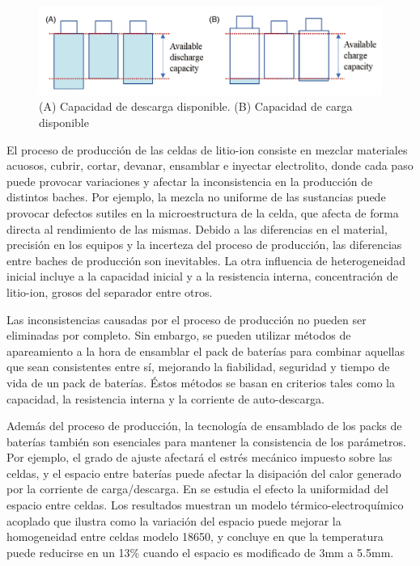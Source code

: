 \documentclass[10pt,a4paper]{article}
\newcounter{subsubsubsection}[subsubsection]
\begin{document}
\begin{figure}[h!]
    \begin{center}
        \includegraphics[width=1\textwidth]{barrel_effect.png}
        \caption{(A) Capacidad de descarga disponible. (B) Capacidad de carga
        disponible}
        \label{barrel_effect}
    \end{center}
\end{figure}


El proceso de producci\'on de las celdas de litio-ion consiste en mezclar
materiales acuosos, cubrir, cortar, devanar, ensamblar e inyectar electrolito,
donde cada paso puede provocar variaciones y afectar la inconsistencia en
la producci\'on de distintos baches. Por ejemplo, la mezcla no uniforme de las
sustancias puede provocar defectos sutiles en la microestructura de la celda,
que afecta de forma directa al rendimiento de las mismas. Debido a las
diferencias en el material, precisi\'on en los equipos y la
incerteza del proceso de producci\'on, las diferencias entre
baches de producci\'on son inevitables. La otra influencia de heterogeneidad
inicial incluye a la capacidad inicial y a la resistencia interna,
concentraci\'on de litio-ion, grosos del separador entre otros.

Las inconsistencias causadas por el proceso de producci\'on no pueden ser
eliminadas por completo. Sin embargo, se pueden utilizar m\'etodos de
apareamiento a la hora de ensamblar el pack de bater\'ias para combinar aquellas
que sean consistentes entre s\'i, mejorando la fiabilidad, seguridad y tiempo
de vida de un pack de bater\'ias. \'Estos m\'etodos se basan en criterios tales
como la capacidad, la resistencia interna y la corriente de auto-descarga.


Adem\'as del proceso de producci\'on, la tecnolog\'ia de ensamblado de los
packs de bater\'ias tambi\'en son esenciales para mantener la consistencia de
los par\'ametros. Por ejemplo, el grado de ajuste afectar\'a el estr\'es
mec\'anico impuesto sobre las celdas, y el espacio entre bater\'ias puede
afectar la disipaci\'on del calor generado por la corriente de carga/descarga.
En \cite{JI2019113683} se estudia el efecto la uniformidad del espacio entre 
celdas. Los resultados muestran un modelo t\'ermico-electroqu\'imico acoplado que 
ilustra como la variaci\'on del espacio puede mejorar la homogeneidad entre 
celdas modelo 18650, y concluye en que la temperatura puede reducirse en un 13\% 
cuando el espacio es modificado de 3mm a 5.5mm.
\end{document}
